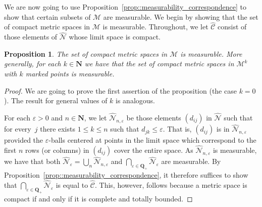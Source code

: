 \documentclass[JEP,XML,SOM,Unicode]{cedram}
\let\mathcal\mathscr
\let\epsilon\varepsilon
\theoremstyle{plain}
\numberwithin{theorem}{section}
\newtheorem{proposition}[theorem]{Proposition}
\theoremstyle{definition}
\newcommand\mmspace{{\mathcal M}}
\newcommand{\matrixmspace}{\mathcal N}
\newcommand{\compactmatrix}{\mathcal C}
\newcommand{\N}{\mathbf{N}}
\newcommand{\Q}{{\mathbf Q}}
\let\wh\widehat
\begin{document}
We are now going to use Proposition~\ref{prop::measurability_correspondence} to show that certain subsets of $\mmspace$ are measurable. We begin by showing that the set of compact metric spaces in $\mmspace$ is measurable. Throughout, we let $\wh{\compactmatrix}$ consist of those elements of $\wh{\matrixmspace}$ whose limit space is compact.

\begin{proposition}
\label{prop::compact_measurable}
The set of compact metric spaces in $\mmspace$ is measurable. More generally, for each $k \in \N$ we have that the set of compact metric spaces in $\mmspace^k$ with $k$ marked points is measurable.
\end{proposition}
\begin{proof}
We are going to prove the first assertion of the proposition (\ie the case $k=0$). The result for general values of $k$ is analogous.

For each $\epsilon > 0$ and $n \in \N$, we let $\wh{\matrixmspace}_{n,\epsilon}$ be those elements $(d_{ij})$ in $\wh{\matrixmspace}$ such that for every~$j$ there exists $1 \leq k \leq n$ such that $d_{jk} \leq \epsilon$. That is, $(d_{ij})$ is in $\wh{\matrixmspace}_{n,\epsilon}$ provided the $\epsilon$-balls centered at points in the limit space which correspond to the first $n$ rows (or columns) in $(d_{ij})$ cover the entire space. As $\wh{\matrixmspace}_{n,\epsilon}$ is measurable, we have that both $\wh{\matrixmspace}_\epsilon = \bigcup_n \wh{\matrixmspace}_{n,\epsilon}$ and $\bigcap_{\epsilon \in \Q_+} \wh{\matrixmspace}_\epsilon$ are measurable. By Proposition~\ref{prop::measurability_correspondence}, it therefore suffices to show that $\bigcap_{\epsilon \in \Q_+} \wh{\matrixmspace}_\epsilon$ is equal to $\wh{\compactmatrix}$. This, however, follows because a metric space is compact if and only if it is complete and totally bounded.
\end{proof}
\end{document}
